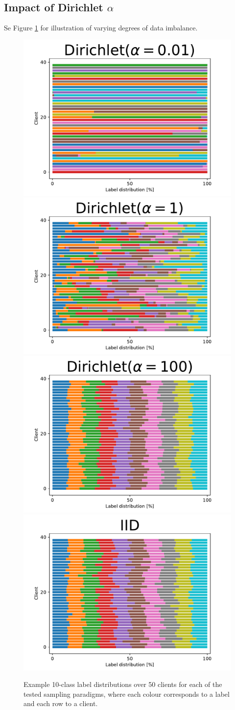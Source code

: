 \documentclass{article}
\begin{document}
\subsection{Impact of Dirichlet $\alpha$}%
Se Figure \ref{fig:splits} for illustration of varying degrees of data imbalance.
\label{app:dirplots}
\begin{figure}[htb!]
    \centering
        \includegraphics[width=0.49\linewidth]{imgs/splits(alpha=0.01)}
        \includegraphics[width=0.49\linewidth]{imgs/splits(alpha=1).pdf}
        \includegraphics[width=0.49\linewidth]{imgs/splits(alpha=100)}
        \includegraphics[width=0.49\linewidth]{imgs/splits(IID)}
    \caption{
        Example 10-class label distributions over 50 clients for each of the tested sampling paradigms, where each colour corresponds to a label and each row to a client.
    }
    \label{fig:splits}
\end{figure}\noindent
\end{document}
